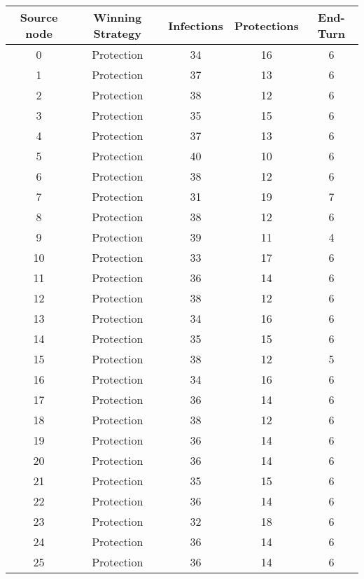 \documentclass[results.tex]{subfiles}
\begin{document}
\begin{center}
  \begin{tabular}{| c || c | c | c | c |}
    \hline
    {\bfseries Source node} & {\bfseries Winning Strategy} & {\bfseries Infections} & {\bfseries Protections} & {\bfseries End-Turn} \\  %
    \hline\hline
    0 & Protection & 34 & 16 & 6 \\ 
    \hline
    1 & Protection & 37 & 13 & 6 \\ 
    \hline
    2 & Protection & 38 & 12 & 6 \\ 
    \hline
    3 & Protection & 35 & 15 & 6 \\ 
    \hline
    4 & Protection & 37 & 13 & 6 \\ 
    \hline
    5 & Protection & 40 & 10 & 6 \\ 
    \hline
    6 & Protection & 38 & 12 & 6 \\ 
    \hline
    7 & Protection & 31 & 19 & 7 \\ 
    \hline
    8 & Protection & 38 & 12 & 6 \\ 
    \hline
    9 & Protection & 39 & 11 & 4 \\ 
    \hline
    10 & Protection & 33 & 17 & 6 \\ 
    \hline
    11 & Protection & 36 & 14 & 6 \\ 
    \hline
    12 & Protection & 38 & 12 & 6 \\ 
    \hline
    13 & Protection & 34 & 16 & 6 \\ 
    \hline
    14 & Protection & 35 & 15 & 6 \\ 
    \hline
    15 & Protection & 38 & 12 & 5 \\ 
    \hline
    16 & Protection & 34 & 16 & 6 \\ 
    \hline
    17 & Protection & 36 & 14 & 6 \\ 
    \hline
    18 & Protection & 38 & 12 & 6 \\ 
    \hline
    19 & Protection & 36 & 14 & 6 \\ 
    \hline
    20 & Protection & 36 & 14 & 6 \\ 
    \hline
    21 & Protection & 35 & 15 & 6 \\ 
    \hline
    22 & Protection & 36 & 14 & 6 \\ 
    \hline
    23 & Protection & 32 & 18 & 6 \\ 
    \hline
    24 & Protection & 36 & 14 & 6 \\ 
    \hline
    25 & Protection & 36 & 14 & 6 \\ 

\end{tabular}
\end{center}
\end{document}
